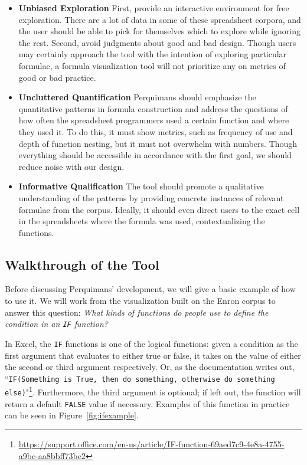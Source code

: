 \documentclass[conference]{IEEEtran}
\newcommand{\toolname}{Perquimans\xspace} \newcommand{\toolnameend}{Perquimans}
\newcommand{\toolnameposs}{Perquimans' }
\begin{document}
	\begin{itemize}
		
		\item [1] \textbf{Unbiased Exploration} First, provide an interactive
		environment for free exploration. There are a lot of data in some of these
		spreadsheet corpora, and the user should be able to pick for themselves which
		to explore while ignoring the rest. Second, avoid judgments about good and bad
		design. Though users may certainly approach the tool with the intention of
		exploring particular formulae, a formula visualization tool will not
		prioritize any on metrics of good or bad practice.
		
		\item [2] \textbf{Uncluttered Quantification} \toolname should emphasize the
		quantitative patterns in formula construction and address the questions of how
		often the spreadsheet programmers used a certain function and where they used
		it. To do this, it must show metrics, such as frequency of use and depth of
		function nesting, but it must not overwhelm with numbers. Though everything
		should be accessible in accordance with the first goal, we should reduce noise
		with our design.

		\item [3] \textbf{Informative Qualification} The tool should promote a qualitative understanding of the patterns by providing concrete instances of relevant
		formulae from the corpus. Ideally, it should even direct users to the exact
		cell in the spreadsheets where the formula was used, contextualizing the
		functions.
		
	\end{itemize}
	
	\subsection{Walkthrough of the Tool} \label{sec:walkthrough}Before discussing
	\toolnameposs development, we will give a basic example of how to use
	it. We will work from the visualization built on the Enron
	corpus to answer this question: \textit{ What kinds of functions do people use
		to define the condition in an \texttt{IF} function?}
	
	In Excel, the \texttt{IF} functions is one of the logical functions: given a condition
	as the first argument that evaluates to either true or false, it takes on the
	value of either the second or third argument respectively. Or, as the
	documentation writes out, ``\texttt{IF(Something is True, then do something, otherwise
	do something
	else)}"\footnote{\href{https://support.office.com/en-us/article/IF-function-69aed7c9-4e8a-4755-a9bc-aa8bbff73be2}{https://support.office.com/en-us/article/IF-function-69aed7c9-4e8a-4755-a9bc-aa8bbff73be2}}. Furthermore, the third argument is optional; if left out, the function will return a default \texttt{FALSE} value if necessary. Examples of this function in practice can be seen in Figure~\ref{fig:ifexample}.
	
\end{document}
